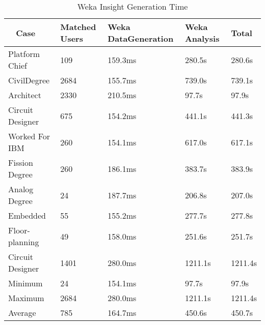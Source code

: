  \begin{table}[H]
  \centering
  \begin{tabular}{|p{17mm}|p{16mm}|p{20mm}|p{19mm}|p{20mm}|}
  \hline
  \
  Case&Matched Users&Weka Data\newline Generation&Weka \newline Analysis&Total\\
  \hline\hline
  Platform Chief&109&159.3ms&280.5s&280.6s\\ \hline
  Civil\newline Degree&2684&155.7ms&739.0s&739.1s\\ \hline 
  Architect&2330&210.5ms&97.7s&97.9s\\ \hline
  Circuit Designer&675&154.2ms&441.1s&441.3s\\ \hline
  Worked For IBM&260&154.1ms&617.0s&617.1s\\ \hline
  Fission Degree&260&186.1ms&383.7s&383.9s\\ \hline
  Analog Degree&24&187.7ms&206.8s&207.0s\\ \hline
  Embedded&55&155.2ms&277.7s&277.8s\\ \hline
  Floor- \newline planning&49&158.0ms&251.6s&251.7s\\ \hline
  Circuit Designer&1401&280.0ms&1211.1s&1211.4s\\ \hline
  \hline\hline
  Minimum&24&154.1ms&97.7s&97.9s\\ \hline
  Maximum&2684&280.0ms&1211.1s&1211.4s\\ \hline
  Average&785&164.7ms&450.6s&450.7s\\ \hline
  \end{tabular}
  \caption{Weka Insight Generation Time}
  \label{tab:weka-perf}
\end{table}
